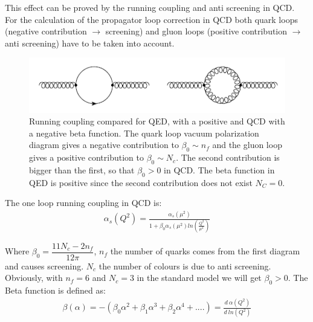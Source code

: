 This effect can be proved by the running coupling and anti screening in QCD.
For the calculation of the propagator loop correction in QCD both quark loops (negative contribution $ \rightarrow $ screening) and gluon loops (positive contribution $ \rightarrow $ anti screening) have to be taken into account. 
\begin{figure}[h!]
\centering
\includegraphics[scale=0.7]{images/Intro/quarkGluonPop.png}
\caption{Running coupling compared for QED, with a positive and QCD with a negative beta function. The quark loop vacuum polarization diagram gives a negative contribution
to $\beta_0 \sim n_f$ and the gluon loop gives a positive contribution to $\beta_0 \sim N_c$. The second contribution is bigger than the first, so that $ \beta_0 > 0 $ in QCD. The beta function in QED is positive since the second contribution does not exist $ N_C=0 $.}
\end{figure}

The one loop running coupling in QCD is:
\begin{equation}
\begin{split}
\alpha_s(Q^2)= \frac{\alpha_s(\mu^2)}{1+\beta_0 \alpha_s(\mu^2) ln(\frac{Q^2}{\mu^2})}
\end{split}
\end{equation}

Where $ \beta_0 = \dfrac{11N_c -2n_f}{12\pi} $, $ n_f $ the number of quarks comes from the first diagram and causes screening.  $ N_c $ the number of colours is due to anti screening. Obviously, with $ n_f = 6 $ and $ N_c = 3 $ in the standard model we will get $ \beta_0 >0 $. The Beta function is defined as:
\begin{equation}
\begin{split}
\beta(\alpha)=-(\beta_0 \alpha^2 + \beta_1 \alpha^3+\beta_2\alpha^4+....)=\frac{d\:\alpha(Q^2)}{d \:ln(Q^2)}
\end{split}
\end{equation}

